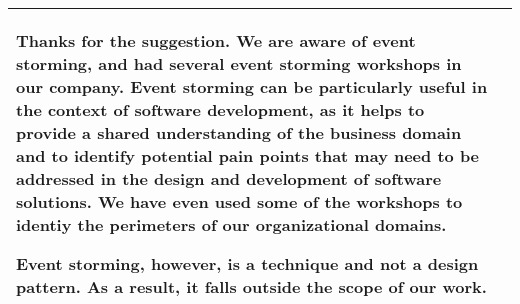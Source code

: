 \documentclass{article}
\begin{document}
\begin{longtable}{|p{7cm}|p{7cm}|}
    Thanks for the suggestion. We are aware of event storming, and had several event storming workshops in our company. Event storming can be particularly useful in the context of software development, as it helps to provide a shared understanding of the business domain and to identify potential pain points that may need to be addressed in the design and development of software solutions. We have even used some of the workshops to identiy the perimeters of our organizational domains. 

    Event storming, however, is a technique and not a design pattern. As a result, it falls outside the scope of our work.
    \\ \hline

 
    \end{longtable}
\end{document}
